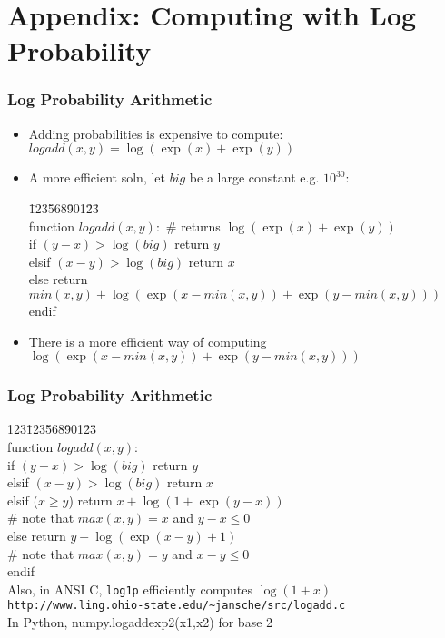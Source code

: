 \section*{Appendix: Computing with Log Probability}

\begin{frame}
\frametitle{Log Probability Arithmetic}
\begin{itemize}[<+->]
\item Adding probabilities is expensive to compute: $logadd(x,y) = \log(\exp(x) + \exp(y))$
\item A more efficient soln, let $big$ be a large constant e.g. $10^{30}$:
\begin{tabbing}
\=123\=568\=901\=23\=\kill \\
\textsf{function } $logadd(x,y):$ {\color{red} \# returns $\log(\exp(x) + \exp(y))$} \\
\>  \textsf{if } $(y - x) > \log(big)$ \color{blue} \textsf{return } $y$ \\
\>  \textsf{elsif  } $(x - y) > \log(big)$ \color{blue} \textsf{return } $x$ \\
\>  \textsf{else } \color{blue} \textsf{return } \\
\>\>\> \color{blue} $min(x, y) + \log(\exp(x - min(x,y)) + \exp(y -
min(x,y)))$ \\
\>  \textsf{endif }
\end{tabbing}
\item There is a more efficient way of computing $\log(\exp(x - 
min(x,y)) + \exp(y - min(x,y)))$
\end{itemize}

\end{frame}

\begin{frame}
\frametitle{Log Probability Arithmetic}
\begin{center}
\begin{tabbing}
123\=123\=568\=901\=23\=\kill \\
\textsf{function } $logadd(x,y):$ \\
\>  \textsf{if } $(y - x) > \log(big)$ \textsf{return } $y$ \\
\>  \textsf{elsif  } $(x - y) > \log(big)$ \textsf{return } $x$ \\
\>  \textsf{elsif ($x \geq y$)} \color{blue} return $x + \log(1 + \exp(y-x))$ \\
\>\> \color{red} \# {\small note that $max(x,y) = x$ and $y-x \leq 0$} \\
\> else \color{blue} return $y + \log(\exp(x-y) + 1)$ \\
\>\> \color{red} \# {\small note that $max(x,y) = y$ and $x-y \leq 0$} \\
\>  \textsf{endif } \\
\color{red} {\small Also, in ANSI C, {\tt log1p} efficiently computes $\log(1+x)$} \\
\color{red} {\footnotesize\tt http://www.ling.ohio-state.edu/\~{}jansche/src/logadd.c} \\
{\small In Python, numpy.logaddexp2(x1,x2) for base 2} 
\end{tabbing}
\end{center}

\end{frame}





